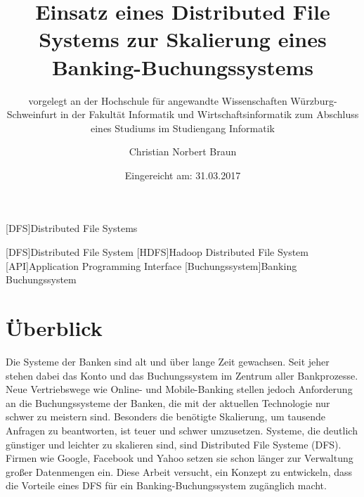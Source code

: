 \documentclass[12pt,oneside,a4paper,parskip]{scrbook}
\newcommand\blankpage{%
    \null
    \thispagestyle{empty}%
    \newpage}
\def\BaAuthor{Christian Norbert Braun}
\def\BaTitle{Einsatz eines Distributed File Systems zur Skalierung eines Banking-Buchungssystems}
\def\BaSupervisorOne{Prof.\ Dr.\ Steffen Heinzl}
\def\BaSupervisorTwo{Prof.\ Dr.\ Peter Braun}
\def\BaDeadline{31.03.2017}
\begin{document}
[DFS]{Distributed File Systems}

\begin{acronym}
  [DFS]{Distributed File System}
  [HDFS]{Hadoop Distributed File System}
  [API]{Application Programming Interface}
  [Buchungssystem]{Banking Buchungssystem}
\end{acronym}




\frontmatter
\titlehead{%
  {Hochschule für angewandte Wissenschaften Würzburg-Schweinfurt\\
   Fakultät Informatik und Wirtschaftsinformatik}}
\subject{Bachelorarbeit}
\title{\BaTitle\\[15mm]}
\subtitle{\normalsize{vorgelegt an der Hochschule f\"{u}r angewandte Wissenschaften W\"{u}rzburg-Schweinfurt in der Fakult\"{a}t Informatik und Wirtschaftsinformatik zum Abschluss eines Studiums im Studiengang Informatik}}
\author{\BaAuthor}
\date{\normalsize{Eingereicht am: \BaDeadline}}
\publishers{
  \normalsize{Erstpr\"{u}fer: \BaSupervisorOne}\\
  \normalsize{Zweitpr\"{u}fer: \BaSupervisorTwo}\\
}


\maketitle
\afterpage{\blankpage}


\chapter*{Überblick}

Die Systeme der Banken sind alt und über lange Zeit gewachsen. Seit jeher stehen dabei das Konto und das Buchungssystem im Zentrum aller Bankprozesse. Neue Vertriebswege wie Online- und Mobile-Banking stellen jedoch Anforderung an die Buchungssysteme der Banken, die mit der aktuellen Technologie nur schwer zu meistern sind. Besonders die benötigte Skalierung, um tausende Anfragen zu beantworten, ist teuer und schwer umzusetzen. Systeme, die deutlich günstiger und leichter zu skalieren sind, sind Distributed File Systeme (DFS). Firmen wie Google, Facebook und Yahoo setzen sie schon länger zur Verwaltung großer Datenmengen ein. Diese Arbeit versucht, ein Konzept zu entwickeln, dass die Vorteile eines DFS für ein Banking-Buchungssystem zugänglich macht.
\end{document}
